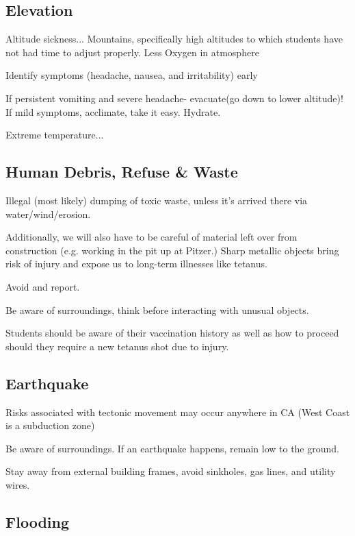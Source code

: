 \documentclass[12pt]{../SOP4_alpha}\usepackage[]{graphicx}\usepackage[]{color}
\begin{document}
\subsection{Elevation}

\NP Altitude sickness... Mountains, specifically high altitudes to which students have not had time to adjust properly. Less Oxygen in atmosphere

\NP Identify symptoms (headache, nausea, and irritability) early

\NP If persistent vomiting and severe headache- evacuate(go down to lower altitude)! If mild symptoms, acclimate, take it easy. Hydrate.

\NP Extreme temperature...

\NP 

\NP 

\subsection{Human Debris, Refuse \& Waste}

Illegal (most likely) dumping of toxic waste, unless it’s arrived there via water/wind/erosion.


\NP Additionally, we will also have to be careful of material left over from construction (e.g. working in the pit up at Pitzer.) Sharp metallic objects bring risk of injury and expose us to long-term illnesses like tetanus.

\NP Avoid and report.

\NP Be aware of surroundings, think before interacting with unusual objects.

\NP Students should be aware of their vaccination history as well as how to proceed should they require a new tetanus shot due to injury.


\subsection{Earthquake}

\NP Risks associated with tectonic movement may occur anywhere in CA (West Coast is a subduction zone)

\NP Be aware of surroundings. If an earthquake happens, remain low to the ground.

\NP Stay away from external building frames, avoid sinkholes, gas lines, and utility wires.

\subsection{Flooding}
\end{document}
